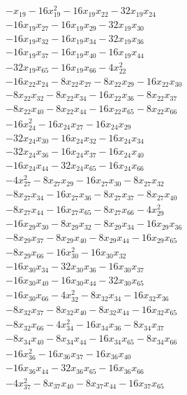 \begin{align*}
&-x_{19} -16x_{19}^{2} -16x_{19}x_{22} -32x_{19}x_{24}\\
&-16x_{19}x_{27} -16x_{19}x_{29} -32x_{19}x_{30}\\
&-16x_{19}x_{32} -16x_{19}x_{34} -32x_{19}x_{36}\\
&-16x_{19}x_{37} -16x_{19}x_{40} -16x_{19}x_{44}\\
&-32x_{19}x_{65} -16x_{19}x_{66} -4x_{22}^{2}\\
&-16x_{22}x_{24} -8x_{22}x_{27} -8x_{22}x_{29} -16x_{22}x_{30}\\
&-8x_{22}x_{32} -8x_{22}x_{34} -16x_{22}x_{36} -8x_{22}x_{37}\\
&-8x_{22}x_{40} -8x_{22}x_{44} -16x_{22}x_{65} -8x_{22}x_{66}\\
&-16x_{24}^{2} -16x_{24}x_{27} -16x_{24}x_{29}\\
&-32x_{24}x_{30} -16x_{24}x_{32} -16x_{24}x_{34}\\
&-32x_{24}x_{36} -16x_{24}x_{37} -16x_{24}x_{40}\\
&-16x_{24}x_{44} -32x_{24}x_{65} -16x_{24}x_{66}\\
&-4x_{27}^{2} -8x_{27}x_{29} -16x_{27}x_{30} -8x_{27}x_{32}\\
&-8x_{27}x_{34} -16x_{27}x_{36} -8x_{27}x_{37} -8x_{27}x_{40}\\
&-8x_{27}x_{44} -16x_{27}x_{65} -8x_{27}x_{66} -4x_{29}^{2}\\
&-16x_{29}x_{30} -8x_{29}x_{32} -8x_{29}x_{34} -16x_{29}x_{36}\\
&-8x_{29}x_{37} -8x_{29}x_{40} -8x_{29}x_{44} -16x_{29}x_{65}\\
&-8x_{29}x_{66} -16x_{30}^{2} -16x_{30}x_{32}\\
&-16x_{30}x_{34} -32x_{30}x_{36} -16x_{30}x_{37}\\
&-16x_{30}x_{40} -16x_{30}x_{44} -32x_{30}x_{65}\\
&-16x_{30}x_{66} -4x_{32}^{2} -8x_{32}x_{34} -16x_{32}x_{36}\\
&-8x_{32}x_{37} -8x_{32}x_{40} -8x_{32}x_{44} -16x_{32}x_{65}\\
&-8x_{32}x_{66} -4x_{34}^{2} -16x_{34}x_{36} -8x_{34}x_{37}\\
&-8x_{34}x_{40} -8x_{34}x_{44} -16x_{34}x_{65} -8x_{34}x_{66}\\
&-16x_{36}^{2} -16x_{36}x_{37} -16x_{36}x_{40}\\
&-16x_{36}x_{44} -32x_{36}x_{65} -16x_{36}x_{66}\\
&-4x_{37}^{2} -8x_{37}x_{40} -8x_{37}x_{44} -16x_{37}x_{65}\\

\end{align*}
